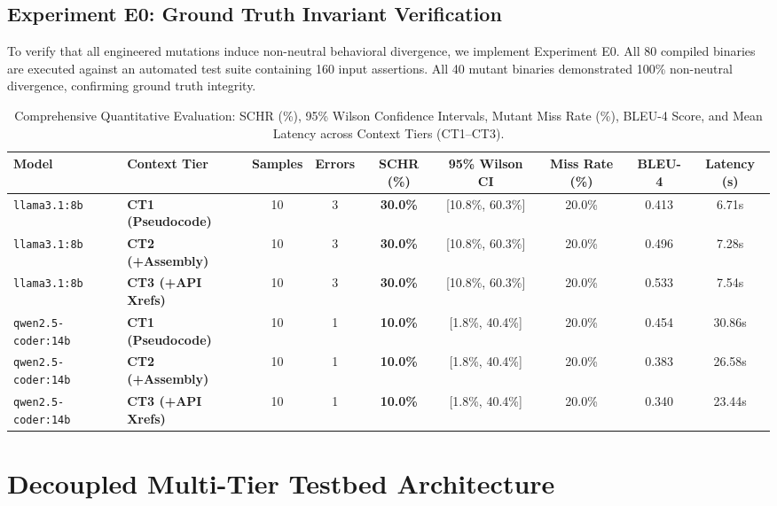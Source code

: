 \documentclass[runningheads]{llncs}
\begin{document}
\subsection{Experiment E0: Ground Truth Invariant Verification}
To verify that all engineered mutations induce non-neutral behavioral divergence, we implement Experiment E0. All 80 compiled binaries are executed against an automated test suite containing 160 input assertions. All 40 mutant binaries demonstrated 100\% non-neutral divergence, confirming ground truth integrity.

\begin{table}[t]
\centering
\caption{Comprehensive Quantitative Evaluation: SCHR (\%), 95\% Wilson Confidence Intervals, Mutant Miss Rate (\%), BLEU-4 Score, and Mean Latency across Context Tiers (CT1--CT3).}
\label{tab:core_results}
\begin{tabular}{llccccccc}
\toprule
\textbf{Model} & \textbf{Context Tier} & \textbf{Samples} & \textbf{Errors} & \textbf{SCHR (\%)} & \textbf{95\% Wilson CI} & \textbf{Miss Rate (\%)} & \textbf{BLEU-4} & \textbf{Latency (s)} \\
\midrule
\texttt{llama3.1:8b} & \textbf{CT1 (Pseudocode)} & 10 & 3 & \textbf{30.0\%} & [10.8\%, 60.3\%] & 20.0\% & 0.413 & 6.71s \\
\texttt{llama3.1:8b} & \textbf{CT2 (+Assembly)}   & 10 & 3 & \textbf{30.0\%} & [10.8\%, 60.3\%] & 20.0\% & 0.496 & 7.28s \\
\texttt{llama3.1:8b} & \textbf{CT3 (+API Xrefs)}  & 10 & 3 & \textbf{30.0\%} & [10.8\%, 60.3\%] & 20.0\% & 0.533 & 7.54s \\
\midrule
\texttt{qwen2.5-coder:14b} & \textbf{CT1 (Pseudocode)} & 10 & 1 & \textbf{10.0\%} & [1.8\%, 40.4\%]  & 20.0\% & 0.454 & 30.86s \\
\texttt{qwen2.5-coder:14b} & \textbf{CT2 (+Assembly)}   & 10 & 1 & \textbf{10.0\%} & [1.8\%, 40.4\%]  & 20.0\% & 0.383 & 26.58s \\
\texttt{qwen2.5-coder:14b} & \textbf{CT3 (+API Xrefs)}  & 10 & 1 & \textbf{10.0\%} & [1.8\%, 40.4\%]  & 20.0\% & 0.340 & 23.44s \\
\bottomrule
\end{tabular}
\end{table}

\section{Decoupled Multi-Tier Testbed Architecture}
\end{document}
